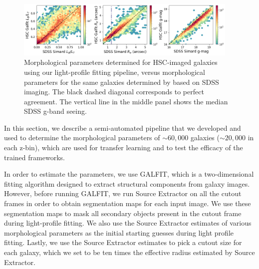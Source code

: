 \begin{figure}[htb]
    \centering
    \includegraphics[width = 0.95\textwidth]{gfit_vs_simard.png}
    \caption{Morphological parameters determined for HSC-imaged galaxies using our light-profile fitting pipeline, versus morphological parameters for the same galaxies determined by \citet{simard_11} based on SDSS imaging. The black dashed diagonal corresponds to perfect agreement. The vertical line in the middle panel shows the median SDSS g-band seeing.}
    \label{fig_c3:gfit_vs_simard}
\end{figure}

In this section, we describe a semi-automated pipeline that we developed and used to determine the morphological parameters of $\sim60,000$ galaxies ($\sim20,000$ in each z-bin), which are used for transfer learning and to test the efficacy of the trained \gampen{} frameworks.

In order to estimate the parameters, we use GALFIT, which is  a two-dimensional fitting algorithm designed to extract structural components from galaxy images. However, before running GALFIT, we run Source Extractor \citep{s_extract} on all the cutout frames in order to obtain segmentation maps for each input image. We use these segmentation maps to mask all secondary objects present in the cutout frame during light-profile fitting. We also use the Source Extractor estimates of various morphological parameters as the initial starting guesses during light profile fitting. Lastly, we use the Source Extractor estimates to pick a cutout size for each galaxy, which we set to be ten times the effective radius estimated by Source Extractor. 

